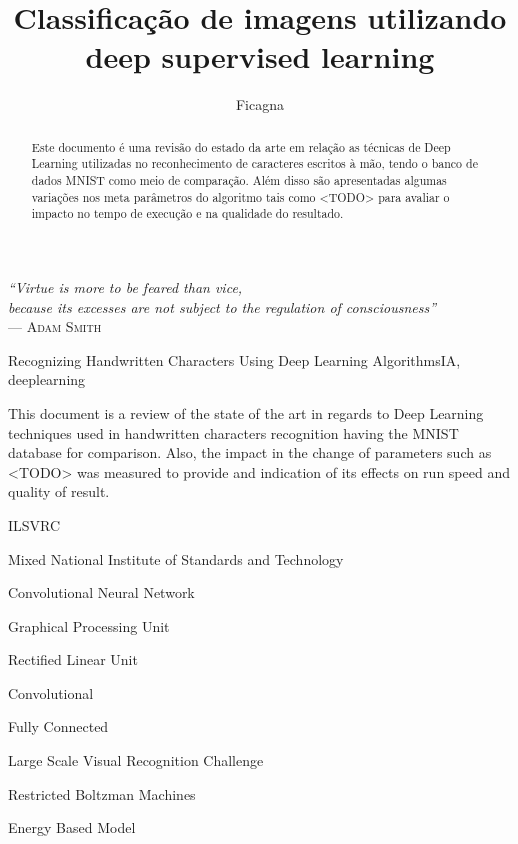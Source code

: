 \documentclass[cic,tc]{iiufrgs}
\title{Classificação de imagens utilizando deep supervised learning}
\author{Ficagna}{Alan}
\date{}{2015}
\begin{document}
\maketitle

\clearpage

\begin{flushright}
  \mbox{}\vfill
  {\sffamily\itshape{}
    ``Virtue is more to be feared than vice,\\
    because its excesses are not subject to the regulation of consciousness''\\}
  --- \textsc{Adam Smith}
\end{flushright}

\begin{abstract}

  Este documento é uma revisão do estado da arte em relação as técnicas de Deep
Learning utilizadas no reconhecimento de caracteres escritos à mão, tendo o
banco de dados MNIST como meio de comparação. Além disso são apresentadas
algumas variações nos meta parâmetros do algoritmo tais como <TODO> para
avaliar o impacto no tempo de execução e na qualidade do resultado.
\end{abstract}

\begin{englishabstract}{Recognizing Handwritten Characters Using Deep Learning Algorithms}{IA, deeplearning} %

This document is a review of the state of the art in regards to Deep Learning
techniques used in handwritten characters recognition having the MNIST
database for comparison. Also, the impact in the change of parameters such as
<TODO> was measured to provide and indication of its effects on run speed and
quality of result.
\end{englishabstract}

\listoffigures
\listoftables
\begin{listofabbrv}{ILSVRC} %
 \item[MNIST] Mixed National Institute of Standards and Technology
 \item[CNN] Convolutional Neural Network
 \item[GPU] Graphical Processing Unit
 \item[ReLU] Rectified Linear Unit
 \item[CONV] Convolutional
 \item[FC] Fully Connected
 \item[ILSVRC] Large Scale Visual Recognition Challenge
 \item[RBM] Restricted Boltzman Machines
 \item[EBM] Energy Based Model
\end{listofabbrv}
\tableofcontents
\end{document}
